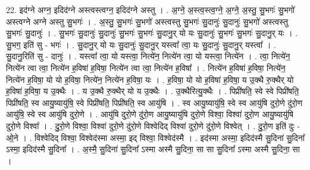 \documentclass[17pt]{extarticle}
\begin{document}
22. इद॑ग्ने अग्न॒ इदिद॑ग्ने अस्त्वस्त्वग्न॒ इदिद॑ग्ने अस्तु । . अ॒ग्ने॒ अ॒स्त्व॒स्त्व॒ग्ने॒ अ॒ग्ने॒ अ॒स्तु॒ सु॒भगः॑ सु॒भगो॑ अस्त्वग्ने अग्ने अस्तु सु॒भगः॑ । . अ॒स्तु॒ सु॒भगः॑ सु॒भगो॑ अस्त्वस्तु सु॒भगः॑ सु॒दानुः॑ सु॒दानुः॑ सु॒भगो॑ अस्त्वस्तु सु॒भगः॑ सु॒दानुः॑ । . सु॒भगः॑ सु॒दानुः॑ सु॒दानुः॑ सु॒भगः॑ सु॒भगः॑ सु॒दानु॒र् यो यः सु॒दानुः॑ सु॒भगः॑ सु॒भगः॑ सु॒दानु॒र् यः । . सु॒भग॒ इति॑ सु - भगः॑ । . सु॒दानु॒र् यो यः सु॒दानुः॑ सु॒दानु॒र् यस्त्वा᳚ त्वा॒ यः सु॒दानुः॑ सु॒दानु॒र् यस्त्वा᳚ । . सु॒दानु॒रिति॑ सु - दानुः॑ । . यस्त्वा᳚ त्वा॒ यो यस्त्वा॒ नित्ये॑न॒ नित्ये॑न त्वा॒ यो यस्त्वा॒ नित्ये॑न । . त्वा॒ नित्ये॑न॒ नित्ये॑न त्वा त्वा॒ नित्ये॑न ह॒विषा॑ ह॒विषा॒ नित्ये॑न त्वा त्वा॒ नित्ये॑न ह॒विषा᳚ । . नित्ये॑न ह॒विषा॑ ह॒विषा॒ नित्ये॑न॒ नित्ये॑न ह॒विषा॒ यो यो ह॒विषा॒ नित्ये॑न॒ नित्ये॑न ह॒विषा॒ यः । . ह॒विषा॒ यो यो ह॒विषा॑ ह॒विषा॒ य उ॒क्थै रु॒क्थैर् यो ह॒विषा॑ ह॒विषा॒ य उ॒क्थैः । . य उ॒क्थै रु॒क्थैर् यो य उ॒क्थैः । . उ॒क्थैरित्यु॒क्थैः । . पिप्री॑षति॒ स्वे स्वे पिप्री॑षति॒ पिप्री॑षति॒ स्व आयु॒ष्यायु॑षि॒ स्वे पिप्री॑षति॒ पिप्री॑षति॒ स्व आयु॑षि । . स्व आयु॒ष्यायु॑षि॒ स्वे स्व आयु॑षि दुरो॒णे दु॑रो॒ण आयु॑षि॒ स्वे स्व आयु॑षि दुरो॒णे । . आयु॑षि दुरो॒णे दु॑रो॒ण आयु॒ष्यायु॑षि दुरो॒णे विश्वा॒ विश्वा॑ दुरो॒ण आयु॒ष्यायु॑षि दुरो॒णे विश्वा᳚ । . दु॒रो॒णे विश्वा॒ विश्वा॑ दुरो॒णे दु॑रो॒णे विश्वेदिद् विश्वा॑ दुरो॒णे दु॑रो॒णे विश्वेत् । . दु॒रो॒ण इति॑ दुः - ओ॒ने । . विश्वेदिद् विश्वा॒ विश्वेद॑स्मा अस्मा॒ इद् विश्वा॒ विश्वेद॑स्मै । . इद॑स्मा अस्मा॒ इदिद॑स्मै सु॒दिना॑ सु॒दिना᳚ ऽस्मा॒ इदिद॑स्मै सु॒दिना᳚ । . अ॒स्मै॒ सु॒दिना॑ सु॒दिना᳚ ऽस्मा अस्मै सु॒दिना॒ सा सा सु॒दिना᳚ ऽस्मा अस्मै सु॒दिना॒ सा । \newline
\end{document}
